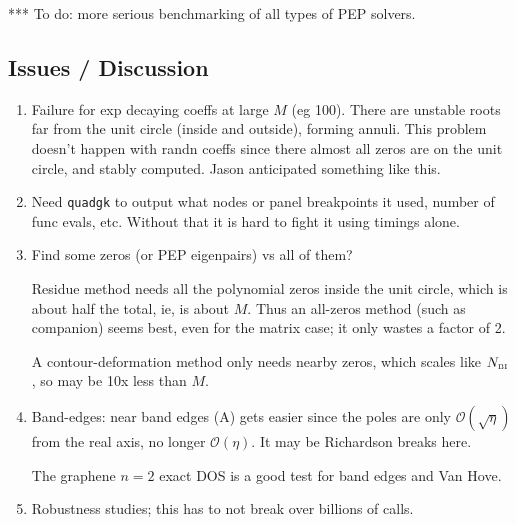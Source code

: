 \documentclass[11pt]{article}
\newcommand{\ben}{\begin{enumerate}}
\newcommand{\een}{\end{enumerate}}
\newcommand{\tbox}[1]{{\mbox{\tiny #1}}}
\newcommand{\bigO}{{\mathcal O}}
\begin{document}
*** To do: more serious benchmarking of all types of PEP solvers.

\subsection{Issues / Discussion}

\ben
\item Failure for exp decaying coeffs at large $M$ (eg 100).
  There are unstable roots far from the unit circle (inside and outside),
  forming annuli.
  This problem doesn't happen with randn coeffs since there almost all zeros
  are on the unit circle, and stably computed.
  Jason anticipated something like this.
  
\item Need {\tt quadgk} to output what nodes or panel breakpoints it used,
  number of func evals, etc.
  Without that it is hard to fight it using timings alone.

\item Find some zeros (or PEP eigenpairs) vs all of them?
  
  Residue method needs all the polynomial zeros inside the unit circle,
  which is about half the total, ie, is about $M$.
  Thus an all-zeros method (such as companion) seems best, even for
  the matrix case; it only wastes a factor of 2.
  
  A contour-deformation method only needs nearby zeros, which scales
  like $N_\tbox{BI}$, so may be 10x less than $M$.

\item
  Band-edges: near band edges (A) gets easier since the poles are only
  $\bigO(\sqrt{\eta})$ from the real axis, no longer $\bigO(\eta)$.
  It may be Richardson breaks here.

  The graphene $n=2$ exact DOS is a good test for band edges and Van Hove.

\item Robustness studies; this has to not break over billions of calls.
\een





  




\end{document}
